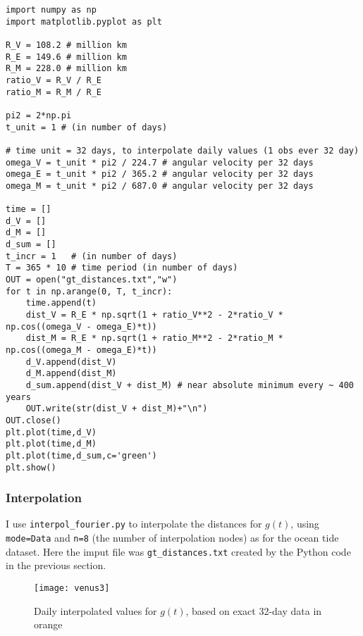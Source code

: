 \documentclass[oneside,10pt]{book}
\begin{document}
\begin{lstlisting}
import numpy as np
import matplotlib.pyplot as plt

R_V = 108.2 # million km
R_E = 149.6 # million km
R_M = 228.0 # million km
ratio_V = R_V / R_E
ratio_M = R_M / R_E

pi2 = 2*np.pi
t_unit = 1 # (in number of days)

# time unit = 32 days, to interpolate daily values (1 obs ever 32 day)
omega_V = t_unit * pi2 / 224.7 # angular velocity per 32 days
omega_E = t_unit * pi2 / 365.2 # angular velocity per 32 days
omega_M = t_unit * pi2 / 687.0 # angular velocity per 32 days

time = []
d_V = []
d_M = []
d_sum = []
t_incr = 1   # (in number of days)
T = 365 * 10 # time period (in number of days)
OUT = open("gt_distances.txt","w")
for t in np.arange(0, T, t_incr):
    time.append(t)
    dist_V = R_E * np.sqrt(1 + ratio_V**2 - 2*ratio_V * np.cos((omega_V - omega_E)*t))
    dist_M = R_E * np.sqrt(1 + ratio_M**2 - 2*ratio_M * np.cos((omega_M - omega_E)*t))
    d_V.append(dist_V) 
    d_M.append(dist_M)
    d_sum.append(dist_V + dist_M) # near absolute minimum every ~ 400 years
    OUT.write(str(dist_V + dist_M)+"\n")
OUT.close()
plt.plot(time,d_V)
plt.plot(time,d_M)
plt.plot(time,d_sum,c='green')
plt.show()
\end{lstlisting}

\subsubsection{Interpolation} 


I use  \texttt{interpol\_fourier.py} to interpolate the distances for $g(t)$, using \texttt{mode=\textquotesingle Data\textquotesingle} and \texttt{n=8} (the number of interpolation nodes) as for
 the ocean tide dataset. Here the imput file was \texttt{gt\_distances.txt} created by the Python code in the previous section. 


\begin{figure}[H]
\centering
\texttt{[image: venus3]} %
\caption{Daily interpolated values for $g(t)$, based on exact 32-day data in orange}
\label{fig:venus3}
\end{figure}
\end{document}
